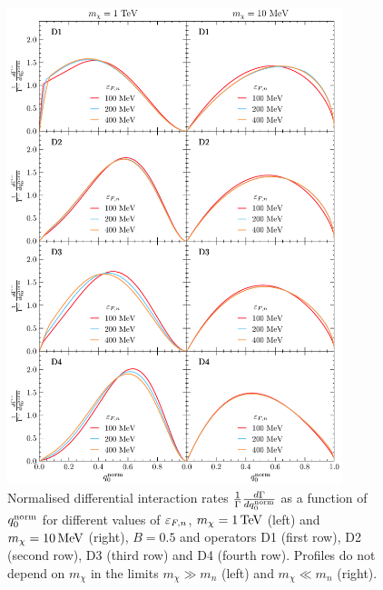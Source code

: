 \begin{figure}[t!bp]
    \centering
    \includegraphics[width = 0.87\textwidth]{capture_1/norm_diff_intrate.pdf}    
    \caption{Normalised differential interaction rates $\frac{1}{\Gamma}\frac{d\Gamma}{dq_0^{\rm norm}}$ as a function of $q_0^{\rm norm}$ for different values of $\varepsilon_{F,n}$, $m_\chi=1{\rm \,TeV}$ (left) and $m_\chi=10{\rm \,MeV}$ (right), $B=0.5$ and  operators D1 (first row), D2 (second row), D3 (third row) and D4 (fourth row). Profiles do not depend on $m_\chi$ in the limits $m_\chi\gg m_n$ (left) and $m_\chi\ll m_n$ (right).  }
    \label{ch3:fig:diffintratesd14}
\end{figure}


